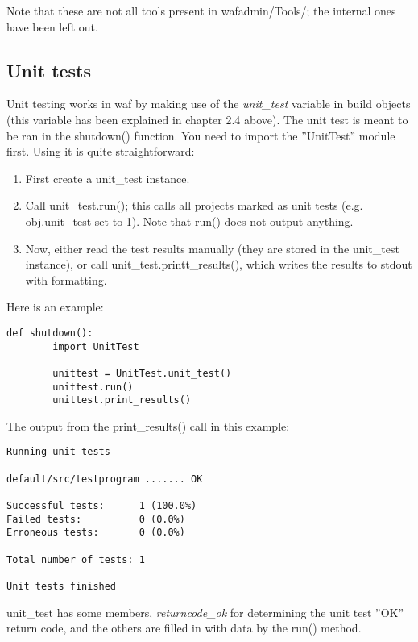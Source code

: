 \documentclass[a4,10pt]{article}
\begin{document}
Note that these are not all tools present in wafadmin/Tools/; the internal ones have been left out.

\subsection{Unit tests}
Unit testing works in waf by making use of the \emph{unit\_test} variable in build objects (this variable has been explained in chapter 2.4 above).
The unit test is meant to be ran in the shutdown() function. You need to import the ''UnitTest'' module first. Using it is quite straightforward:\\

\begin{enumerate}
	\item First create a unit\_test instance.
	\item Call unit\_test.run(); this calls all projects marked as unit tests (e.g. obj.unit\_test set to 1). Note that run() does not output anything.
	\item Now, either read the test results manually (they are stored in the unit\_test instance), or call unit\_test.printt\_results(), which writes the results to stdout with formatting.
\end{enumerate}

Here is an example:

\begin{center}
	\begin{lstlisting}
def shutdown():
        import UnitTest

        unittest = UnitTest.unit_test()
        unittest.run()
        unittest.print_results()
	\end{lstlisting}
\end{center}

The output from the print\_results() call in this example:

\begin{center}
	\begin{verbatim}
Running unit tests

default/src/testprogram ....... OK

Successful tests:      1 (100.0%)
Failed tests:          0 (0.0%)
Erroneous tests:       0 (0.0%)

Total number of tests: 1

Unit tests finished
	\end{verbatim}
\end{center}

unit\_test has some members, \emph{returncode\_ok} for determining the unit test ''OK'' return code, and the others are filled in with data by the run() method.
\end{document}
